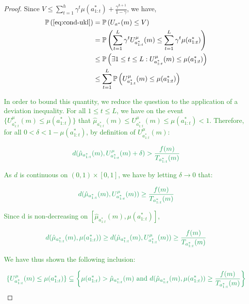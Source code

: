 \documentclass[runningheads, envcountsame, a4paper]{llncs}
\newcommand{\diff}[1]{\textcolor{ForestGreen}{#1}}
\begin{document}
\begin{proof}
Since $V \leq \sum_{t=1}^h \gamma^t \mu(a^*_{1:t}) + \frac{\gamma^{h+1}}{1-\gamma}$, we have,
\begin{align*}
   \mathbb{P}\left(\eqref{eq:cond-ukl}\right) &=  \mathbb{P}\left(U_{a^*}(m) \leq V\right)\\
    &= \mathbb{P}\left(\sum_{t=1}^L \gamma^t U^{\mu}_{a^*_{1:t}}(m) \leq \sum_{t=1}^L \gamma^t \mu(a^*_{1:t})\right)\\
    &\leq \mathbb{P}\left(\exists 1\leq t \leq L : U^{\mu}_{a^*_{1:t}}(m) \leq \mu(a^*_{1:t})\right) \\
    &\leq \sum_{t=1}^L\mathbb{P}\left(U^{\mu}_{a^*_{1:t}}(m) \leq \mu(a^*_{1:t})\right)
\end{align*}

\diff{In order to bound this quantity, we reduce the question to the application of a deviation inequality. For all $1\leq t\leq L$, we have on the event $\{U^{\mu}_{a^*_{1:t}}(m) \leq \mu(a^*_{1:t})\}$ that $\hat{\mu}_{a^*_{1:t}}(m) \leq U^{\mu}_{a^*_{1:t}}(m) \leq \mu(a^*_{1:t}) < 1$. Therefore, for all $0 < \delta < 1 - \mu(a^*_{1:t})$, by definition of $U^{\mu}_{a^*_{1:t}}(m)$:}

\begin{equation*}
    \diff{d(\hat{\mu}_{a^*_{1:t}}(m), U^{\mu}_{a^*_{1:t}}(m)+\delta) > \frac{f(m)}{T_{a^*_{1:t}}(m)}}
\end{equation*}

\diff{As $d$ is continuous on $(0,1)\times[0, 1]$, we have by letting $\delta \rightarrow 0$ that:}

\begin{equation*}
    \diff{d(\hat{\mu}_{a^*_{1:t}}(m), U^{\mu}_{a^*_{1:t}}(m)) \geq \frac{f(m)}{T_{a^*_{1:t}}(m)}}
\end{equation*}

\diff{Since d is non-decreasing on $[\hat{\mu}_{a^*_{1:t}}(m), \mu(a^*_{1:t})]$,}

\begin{equation*}
    \diff{d(\hat{\mu}_{a^*_{1:t}}(m), \mu(a^*_{1:t})) \geq d(\hat{\mu}_{a^*_{1:t}}(m), U^{\mu}_{a^*_{1:t}}(m)) \geq \frac{f(m)}{T_{a^*_{1:t}}(m)}}
\end{equation*}

\diff{We have thus shown the following inclusion:}

\begin{equation*}
    \diff{\{U^{\mu}_{a^*_{1:t}}(m) \leq \mu(a^*_{1:t})\} \subseteq \left\{ \mu(a^*_{1:t}) > \hat{\mu}_{a^*_{1:t}}(m) \text{ and } d(\hat{\mu}_{a^*_{1:t}}(m), \mu(a^*_{1:t})) \geq \frac{f(m)}{T_{a^*_{1:t}}(m)} \right\}}
\end{equation*}


\end{proof}
\end{document}
